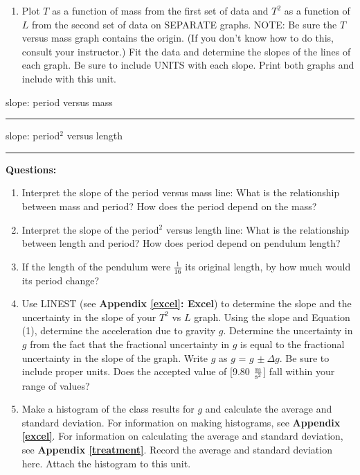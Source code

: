 \begin{enumerate}
\item Plot $T$ as a function of mass from the first set of data and $T^2$ as a function of $L$ from the second set of data on SEPARATE graphs. NOTE: Be sure the $T$ versus mass graph contains the origin. (If you don't know how to do this, consult your instructor.) Fit the data and determine the slopes of the lines of each graph. Be sure to include UNITS with each slope. Print both graphs and include with this unit.

\end{enumerate}

\vspace{10pt}

slope: period versus mass \rule{1.5in}{0.2pt}

\vspace{10pt}

slope: period$^2$ versus length \rule{1.5in}{0.2pt}

\vspace{10pt}

{\noindent \bf Questions:}

\begin{enumerate}
\item Interpret the slope of the period versus mass line: What is the relationship between mass and period? How does the period depend on the mass? 
\vspace{20mm}

\item Interpret the slope of the period$^2$ versus length line: What is the relationship between length and period? How does period depend on pendulum length? 
\vspace{20mm}

\item If the length of the pendulum were $\frac{1}{16}$ its original length, by how much would its period change? 
\vspace{20mm}

\item Use LINEST (see \textbf{Appendix \ref{excel}: Excel}) to determine the slope and the uncertainty in the slope of your $T^2$ vs $L$ graph. Using the slope and Equation (1), determine the acceleration due to gravity $g$. Determine the uncertainty in $g$ from the fact that the fractional uncertainty in $g$ is equal to the fractional uncertainty in the slope of the graph. Write $g$ as $g$ = $g$ \( \pm \ \Delta  g\). Be sure to include proper units. Does the accepted value of [9.80 $\frac{\rm m}{\rm s^2}$] fall within your range of values?
\vspace{30mm}

\item Make a histogram of the class results for $g$ and calculate the average and standard deviation. For information on making histograms, see \textbf{Appendix \ref{excel}}. For information on calculating the average and standard deviation, see \textbf{Appendix \ref{treatment}}. Record the average and standard deviation here. Attach the histogram to this unit.
\end{enumerate}
